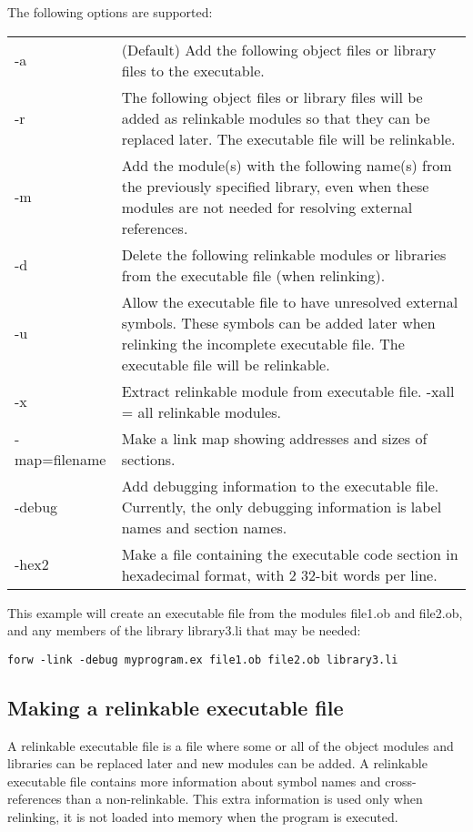 \documentclass[forwardcom.tex]{subfiles}
\begin{document}
The following options are supported:\\
\begin{tabular}{|p{28mm}p{130mm}|}
\hline
-a & (Default) Add the following object files or library files to the executable.\\
-r & The following object files or library files will be added as relinkable modules so that they can be replaced later. The executable file will be relinkable.\\
-m & Add the module(s) with the following name(s) from the previously specified library, even when 
these modules are not needed for resolving external references.\\
-d & Delete the following relinkable modules or libraries from the executable file (when relinking).\\
-u & Allow the executable file to have unresolved external symbols. These symbols can be added later when relinking the incomplete executable file. The executable file will be relinkable.\\ 
-x & Extract relinkable module from executable file. -xall = all relinkable modules.\\
-map=filename & Make a link map showing addresses and sizes of sections.\\
-debug & Add debugging information to the executable file. Currently, the only debugging information is label names and section names.\\
-hex2  & Make a file containing the executable code section in hexadecimal format, with 2 32-bit words per line.\\
\hline
\end{tabular}
\vv

This example will create an executable file from the modules file1.ob and file2.ob, and any members of the library library3.li that may be needed:
\begin{lstlisting}[frame=single]
forw -link -debug myprogram.ex file1.ob file2.ob library3.li
\end{lstlisting}
\vspace{4mm}

\vv


\subsection{Making a relinkable executable file} \label{makingARelinkableExecutableFile}
A relinkable executable file is a file where some or all of the object modules and libraries can be replaced later and new modules can be added. A relinkable executable file contains more information about symbol names and cross-references than a non-relinkable. This extra information is used only when relinking, it is not loaded into memory when the program is executed.
\vv
\end{document}
